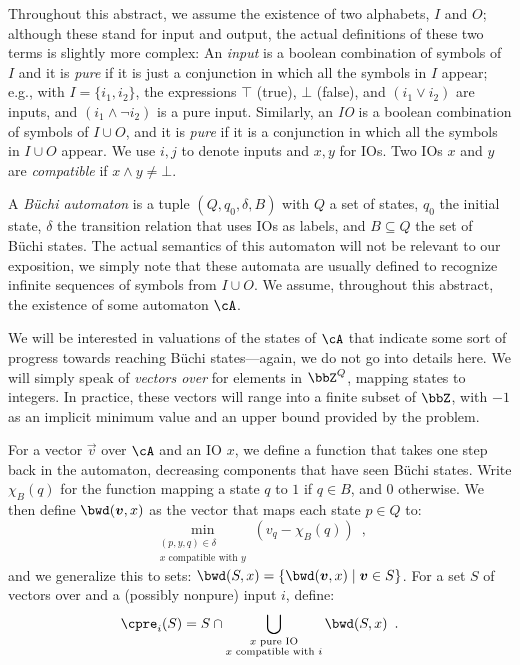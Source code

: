 \documentclass[runningheads,a4paper,draft]{llncs}
\begin{document}
Throughout this abstract, we assume the existence of two alphabets, \(I\) and
\(O\); although these stand for input and output, the actual definitions of
these two terms is slightly more complex: An \emph{input} is a boolean
combination of symbols of \(I\) and it is \emph{pure} if it is just a
conjunction in which all the symbols in \(I\) appear; e.g., with \(I = \{i_1,
i_2\}\), the expressions \(\top\) (true), \(\bot\) (false), and \((i_1 \lor
i_2)\) are inputs, and \((i_1 \land \neg i_2)\) is a pure input.  Similarly,
an \emph{IO} is a boolean combination of symbols of \(I \cup O\), and it is
\emph{pure} if it is a conjunction in which all the symbols in \(I \cup O\)
appear.  We use \(i, j\) to denote inputs and \(x, y\) for IOs.  Two IOs \(x\)
and \(y\) are \emph{compatible} if \(x \land y \neq \bot\).

A \emph{Büchi automaton} \cA is a tuple \((Q, q_0, \delta, B)\) with \(Q\) a set of
states, \(q_0\) the initial state, \(\delta\) the transition relation that uses IOs as
labels, and \(B \subseteq Q\) the set of Büchi states.  The actual semantics of this
automaton will not be relevant to our exposition, we simply note that these
automata are usually defined to recognize infinite sequences of symbols from
\(I \cup O\).  We assume, throughout this abstract, the existence of some automaton
\(\cA\).

We will be interested in valuations of the states of \(\cA\) that indicate some
sort of progress towards reaching Büchi states---again, we do not go into details
here.  We will simply speak of \emph{vectors over \cA} for elements in
\(\bbZ^Q\), mapping states to integers.  In practice, these vectors will range
into a finite subset of \(\bbZ\), with \(-1\) as an implicit minimum value and an
upper bound provided by the problem.

For a vector \(\vec{v}\) over \(\cA\) and an IO \(x\), we define a function that takes
one step back in the automaton, decreasing components that have seen Büchi
states.  Write \(\chi_B(q)\) for the function mapping a state \(q\) to \(1\) if \(q \in B\),
and \(0\) otherwise.  We then define \(\bwd(\vec{v}, x)\) as the vector that maps
each state \(p \in Q\) to:
\[\min_{\substack{(p, y, q) \in \delta\\ x \text{ compatible with } y}} \left(v_q -
  \chi_B(q)\right)\enspace,\]
and we generalize this to sets: \(\bwd(S, x) = \{\bwd(\vec{v}, x) \mid \vec{v}
\in S\}\).
%
For a set \(S\) of vectors over \cA and a (possibly nonpure) input \(i\), define:
\[\cpre_i(S) = S \cap \bigcup_{\substack{x \text{ pure IO}\\x \text{ compatible with } i}} \bwd(S, x)\enspace.\]
\end{document}
